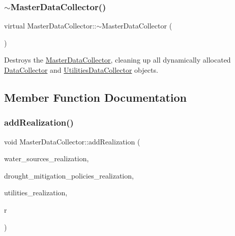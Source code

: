 \subsubsection{\texorpdfstring{$\sim$\+Master\+Data\+Collector()}{~MasterDataCollector()}}
{\footnotesize\ttfamily virtual Master\+Data\+Collector\+::$\sim$\+Master\+Data\+Collector (\begin{DoxyParamCaption}{ }\end{DoxyParamCaption})\hspace{0.3cm}{\ttfamily [virtual]}}



Destroys the \mbox{\hyperlink{classMasterDataCollector}{Master\+Data\+Collector}}, cleaning up all dynamically allocated \mbox{\hyperlink{classDataCollector}{Data\+Collector}} and \mbox{\hyperlink{classUtilitiesDataCollector}{Utilities\+Data\+Collector}} objects. 



\subsection{Member Function Documentation}
\mbox{\label{classMasterDataCollector_aadb319947e62055428b18339d559a0ef}} 
\subsubsection{\texorpdfstring{add\+Realization()}{addRealization()}}
{\footnotesize\ttfamily void Master\+Data\+Collector\+::add\+Realization (\begin{DoxyParamCaption}\item[{vector$<$ \mbox{\hyperlink{classWaterSource}{Water\+Source}} $\ast$$>$}]{water\+\_\+sources\+\_\+realization,  }\item[{vector$<$ \mbox{\hyperlink{classDroughtMitigationPolicy}{Drought\+Mitigation\+Policy}} $\ast$$>$}]{drought\+\_\+mitigation\+\_\+policies\+\_\+realization,  }\item[{vector$<$ \mbox{\hyperlink{classUtility}{Utility}} $\ast$$>$}]{utilities\+\_\+realization,  }\item[{unsigned long}]{r }\end{DoxyParamCaption})}



